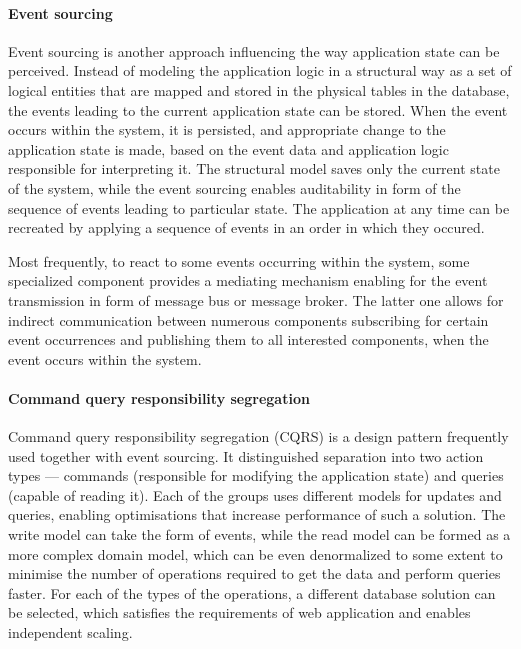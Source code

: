 \paragraph{Event sourcing}

Event sourcing is another approach influencing the way application state can be perceived. Instead of modeling the application logic in a structural way as a set of logical entities that are mapped and stored in the physical tables in the database, the events leading to the current application state can be stored. When the event occurs within the system, it is persisted, and appropriate change to the application state is made, based on the event data and application logic responsible for interpreting it. The structural model saves only the current state of the system, while the event sourcing enables auditability in form of the sequence of events leading to particular state. The application at any time can be recreated by applying a sequence of events in an order in which they occured.

Most frequently, to react to some events occurring within the system, some specialized component provides a mediating mechanism enabling for the event transmission in form of message bus or message broker. The latter one allows for indirect communication between numerous components subscribing for certain event occurrences and publishing them to all interested components, when the event occurs within the system.

\paragraph{Command query responsibility segregation}

Command query responsibility segregation (CQRS) is a design pattern frequently used together with event sourcing. It distinguished separation into two action types --- commands (responsible for modifying the application state) and queries (capable of reading it). Each of the groups uses different models for updates and queries, enabling optimisations that increase performance of such a solution. The write model can take the form of events, while the read model can be formed as a more complex domain model, which can be even denormalized to some extent to minimise the number of operations required to get the data and perform queries faster. For each of the types of the operations, a different database solution can be selected, which satisfies the requirements of web application and enables independent scaling. 

